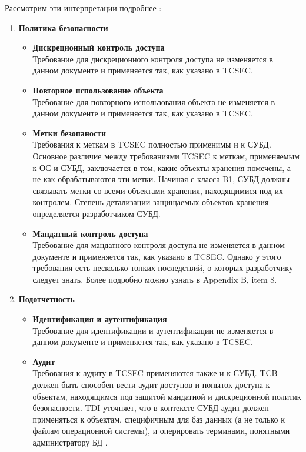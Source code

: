 Рассмотрим эти интерпретации подробнее \cite{PurpleBook}:
\begin{enumerate}
	\item \textbf{Политика безопасности}
	\begin{itemize}
		\item \textbf{Дискреционный контроль доступа}\\
		Требование для дискреционного контроля доступа не изменяется в данном документе и применяется так, как указано в TCSEC.
		\item \textbf{Повторное использование объекта}\\
		Требование для повторного использования объекта не изменяется в данном документе и применяется так, как указано в TCSEC.
		\item \textbf{Метки безопаности}\\
		Требования к меткам в TCSEC полностью применимы и к СУБД. Основное различие между требованиями TCSEC к меткам, применяемым к ОС и СУБД, заключается в том, какие объекты хранения помечены, а не как обрабатываются эти метки.
		Начиная с класса B1, СУБД должны связывать метки со всеми объектами хранения, находящимися под их контролем. Степень детализации защищаемых объектов хранения определяется разработчиком СУБД.
		\item \textbf{Мандатный контроль доступа}\\
		Требование для мандатного контроля доступа не изменяется в данном документе и применяется так, как указано в TCSEC. Однако у этого требования есть несколько тонких последствий, о которых разработчику следует знать. Более подробно можно узнать в \cite{PurpleBook} Appendix B, item 8.
	\end{itemize}
	\item \textbf{Подотчетность}
	\begin{itemize}
		\item \textbf{Идентификация и аутентификация}\\
		Требование для идентификации и аутентификации не изменяется в данном документе и применяется так, как указано в TCSEC.
		\item \textbf{Аудит}\\
		Требования к аудиту в TCSEC применяются также и к СУБД. TCB должен быть способен вести аудит доступов и попыток доступа к объектам, находящимся под защитой мандатной и дискреционной политик безопасности. TDI уточняет, что в контексте СУБД аудит должен применяться к объектам, специфичным для баз данных (а не только к файлам операционной системы), и оперировать терминами, понятными администратору БД \cite[IR-4]{PurpleBook}. 

\end{itemize}
\end{enumerate}
